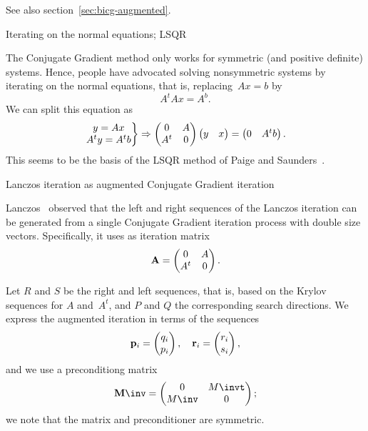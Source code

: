 \documentclass[11pt]{artikel3}
\begin{document}
\begin{Outline}
See also section~\ref{sec:bicg-augmented}.

 {Iterating on the normal equations; LSQR}

The Conjugate Gradient method only works for symmetric (and positive
definite) systems. Hence, people have advocated solving nonsymmetric
systems by iterating on the normal equations, that is,
replacing~$Ax=b$ by \[ A^tAx=A^b.\]
We can split this equation as
\[ \left.\begin{matrix}y=Ax\cr A^ty=A^tb\end{matrix}\right\}\Rightarrow
    \begin{pmatrix}0&A\cr A^t&0\end{pmatrix}\begin{pmatrix}y&x\end{pmatrix}=\begin{pmatrix}0&A^tb\end{pmatrix}.\] This seems
to be the basis of the LSQR method of Paige and
Saunders~\cite{PaSa:lsqr}.

 {Lanczos iteration as augmented
Conjugate Gradient iteration}
\label{sec:bicg-augmented}

\def\Ab{{\mathbf A}}\def\Mb{{\mathbf M}\inv}
\def\pb{{\mathbf p}}\def\rb{{\mathbf r}}
Lanczos~\cite{La:differential-book} observed that the left and right
sequences of the Lanczos iteration can be generated from a single
Conjugate Gradient iteration process with double size vectors.
Specifically, it uses as iteration matrix \[\Ab=\begin{pmatrix}0&A\cr A^t&0\end{pmatrix}.\]

Let $R$ and $S$ be the right and left sequences, that is, based on the
Krylov sequences for $A$ and~$A^t$, and $P$ and $Q$ the corresponding
search directions.
We express the augmented iteration in terms of the sequences
\[ \pb_i=\begin{pmatrix}q_i\cr p_i\end{pmatrix},\quad \rb_i=\begin{pmatrix}r_i\cr s_i\end{pmatrix}, \]
and we use a preconditiong matrix \[\Mb=\begin{pmatrix}0&M\invt\cr
M\inv&0\end{pmatrix};\]
we note that the matrix and preconditioner are symmetric.


\end{Outline}
\end{document}
